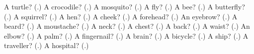 \begin{tcolorbox}[breakable,colback=teal!4,colframe=teal!35!black,title={Before you move on}]
A turtle? (\textbf{}.) A crocodile? (\textbf{}.) A mosquito? (\textbf{}.) A fly? (\textbf{}.) A bee? (\textbf{}.) A butterfly? (\textbf{}.) A squirrel? (\textbf{}.) A hen? (\textbf{}.) A cheek? (\textbf{}.) A forehead? (\textbf{}.) An eyebrow? (\textbf{}.) A beard? (\textbf{}.) A moustache? (\textbf{}.) A neck? (\textbf{}.) A chest? (\textbf{}.) A back? (\textbf{}.) A waist? (\textbf{}.) An elbow? (\textbf{}.) A palm? (\textbf{}.) A fingernail? (\textbf{}.) A brain? (\textbf{}.) A bicycle? (\textbf{}.) A ship? (\textbf{}.) A traveller? (\textbf{}.) A hospital? (\textbf{}.)
\end{tcolorbox}
